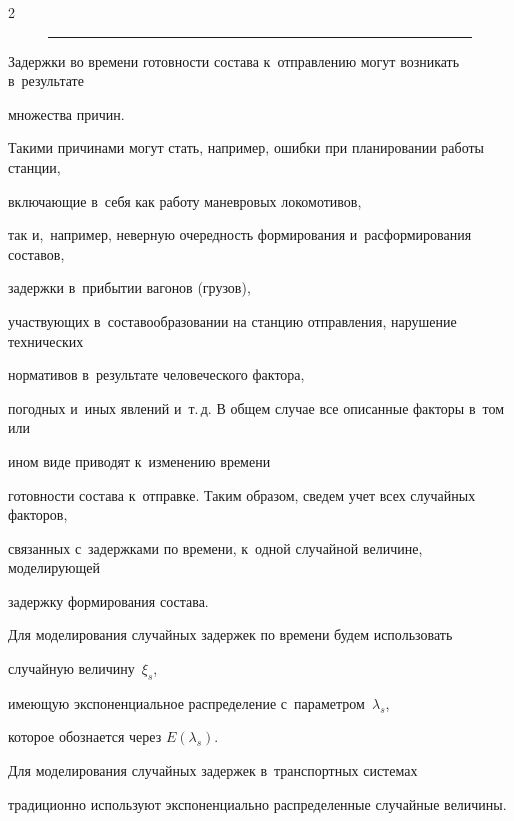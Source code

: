 \begin{multicols}{2}
\begin{figure}[b]
\begin{enumerate}[1.]
    \end{enumerate}


    \hrule




\end{figure}








Задержки во времени готовности состава к~отправлению могут возникать в~результате 


множества причин.


Такими причинами могут стать, например, ошибки при планировании работы станции, 


включающие в~себя как работу маневровых локомотивов,


так и,~например, неверную очередность формирования и~расформирования составов, 


задержки в~прибытии вагонов (грузов),


участвующих в~составообразовании на станцию отправления, нарушение технических 


нормативов в~результате человеческого фактора,


погодных и~иных явлений и~т.\,д. В общем случае все описанные факторы в~том или 


ином виде приводят к~изменению времени


готовности состава к~отправке. Таким образом, сведем учет всех случайных факторов,


связанных с~задержками по времени, к~одной случайной величине, моделирующей 


задержку формирования состава.


{





}





Для моделирования случайных задержек по времени будем использовать 


случайную величину~$\xi_s$,


имеющую экспоненциальное распределение с~параметром~$\lambda_s$, 


которое обознается через $E(\lambda_s)$.


Для моделирования случайных задержек в~транспортных системах 


традиционно используют экспоненциально распределенные случайные величины. 



\end{multicols}
